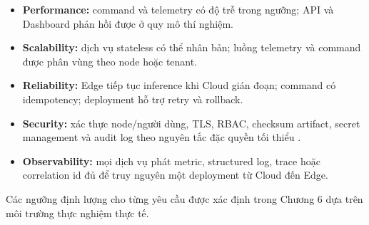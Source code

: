 \begin{itemize}
  \item \textbf{Performance:} command và telemetry có độ trễ trong ngưỡng; API
        và Dashboard phản hồi được ở quy mô thí nghiệm.
  \item \textbf{Scalability:} dịch vụ stateless có thể nhân bản; luồng telemetry
        và command được phân vùng theo node hoặc tenant.
  \item \textbf{Reliability:} Edge tiếp tục inference khi Cloud gián đoạn; command
        có idempotency; deployment hỗ trợ retry và rollback.
  \item \textbf{Security:} xác thực node/người dùng, TLS, RBAC, checksum artifact,
        secret management và audit log theo nguyên tắc đặc quyền tối thiểu
        \cite{nist800207}.
  \item \textbf{Observability:} mọi dịch vụ phát metric, structured log, trace hoặc
        correlation id đủ để truy nguyên một deployment từ Cloud đến Edge.
\end{itemize}

Các ngưỡng định lượng cho từng yêu cầu được xác định trong Chương 6 dựa trên
môi trường thực nghiệm thực tế.